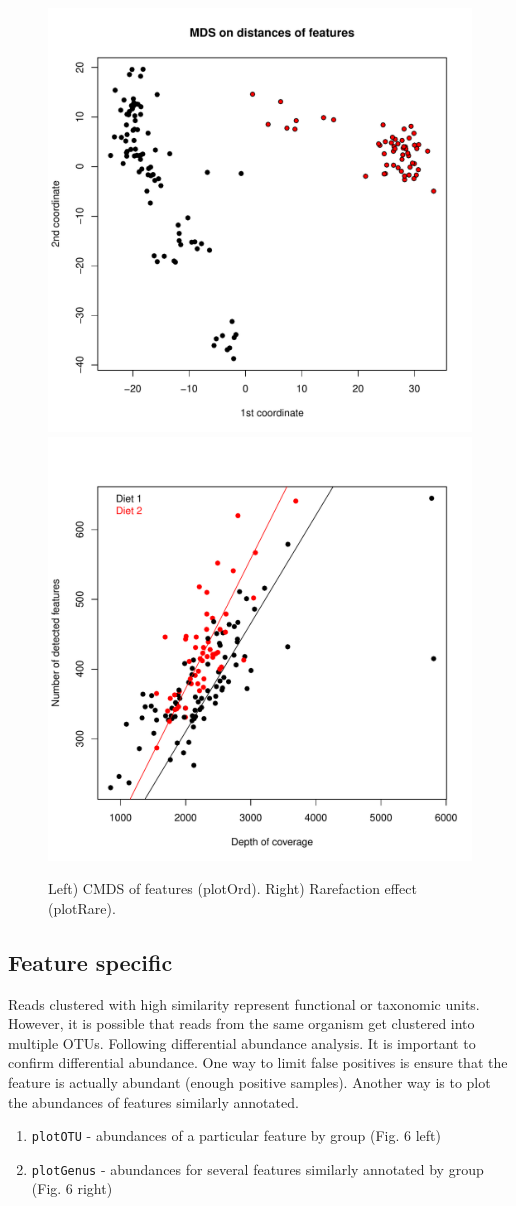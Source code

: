 \documentclass[a4paper,11pt]{article}\usepackage[]{graphicx}\usepackage[]{color}
\newenvironment{knitrout}{}{} %
\begin{document}
\begin{knitrout}
\begin{figure}[]
\includegraphics[width=.5\linewidth,height=.5\linewidth]{figure/MDSandRareplots1} 
\includegraphics[width=.5\linewidth,height=.5\linewidth]{figure/MDSandRareplots2} \caption[Left) CMDS of features (plotOrd)]{Left) CMDS of features (plotOrd). Right) Rarefaction effect (plotRare).\label{fig:MDSandRareplots}}
\end{figure}


\end{knitrout}


\subsection{Feature specific}
Reads clustered with high similarity represent functional or taxonomic units. 
However, it is possible that reads from the same organism get clustered into
multiple OTUs. Following differential abundance analysis. 
It is important to confirm differential abundance. 
One way to limit false positives is ensure that the feature is actually abundant (enough positive samples). 
Another way is to plot the abundances of features similarly annotated.

\begin{enumerate}
\item \texttt{plotOTU} - abundances of a particular feature by group (Fig. 6 left)
\item \texttt{plotGenus} - abundances for several features similarly annotated by group (Fig. 6 right)
\end{enumerate}
\end{document}
